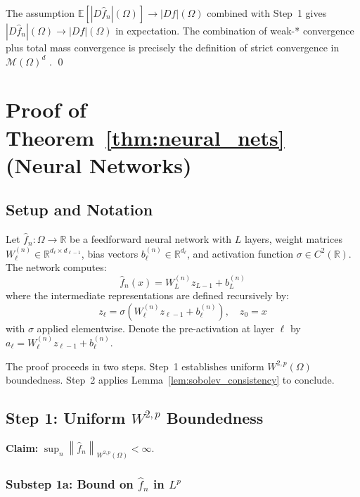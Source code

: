 \documentclass[12pt]{article}
\newcommand{\norm}[1]{\left\| #1 \right\|}
\newcommand{\R}{\mathbb{R}}
\newcommand{\E}{\mathbb{E}}
\newcommand{\Wtwop}{W^{2,p}(\Omega)}
\newcommand{\cM}{\mathcal{M}(\Omega)^d}
\newcommand{\fn}{\hat{f}_n}
\begin{document}
	The assumption $\E[|D\fn|(\Omega)] \to |Df|(\Omega)$ combined with Step~1
	gives $|D\fn|(\Omega) \to |Df|(\Omega)$ in expectation. The combination of
	weak-* convergence plus total mass convergence is precisely the definition of
	strict convergence in $\cM$ \citep[Definition~3.13]{ambrosio2000bv}.
	\qed
	
	\section{Proof of Theorem~\ref{thm:neural_nets} (Neural Networks)}
	\label{app:neural_nets}
	
	\subsection{Setup and Notation}
	
	Let $\fn: \Omega \to \R$ be a feedforward neural network with $L$ layers,
	weight matrices $W_\ell^{(n)} \in \R^{d_\ell \times d_{\ell-1}}$, bias vectors
	$b_\ell^{(n)} \in \R^{d_\ell}$, and activation function $\sigma \in C^2(\R)$.
	The network computes:
	\begin{equation}
		\fn(x) = W_L^{(n)} z_{L-1} + b_L^{(n)}
	\end{equation}
	where the intermediate representations are defined recursively by:
	\begin{equation}
		z_\ell = \sigma\!\left(W_\ell^{(n)} z_{\ell-1} + b_\ell^{(n)}\right),
		\quad z_0 = x
	\end{equation}
	with $\sigma$ applied elementwise. Denote the pre-activation at layer $\ell$ by
	$a_\ell = W_\ell^{(n)} z_{\ell-1} + b_\ell^{(n)}$.
	
	The proof proceeds in two steps. Step~1 establishes uniform $\Wtwop$
	boundedness. Step~2 applies Lemma~\ref{lem:sobolev_consistency} to conclude.
	
	\subsection{Step 1: Uniform $W^{2,p}$ Boundedness}
	
	\textbf{Claim:} $\sup_n \norm{\fn}_{\Wtwop} < \infty$.
	
	\subsubsection*{Substep 1a: Bound on $\fn$ in $L^p$}
	
\end{document}
